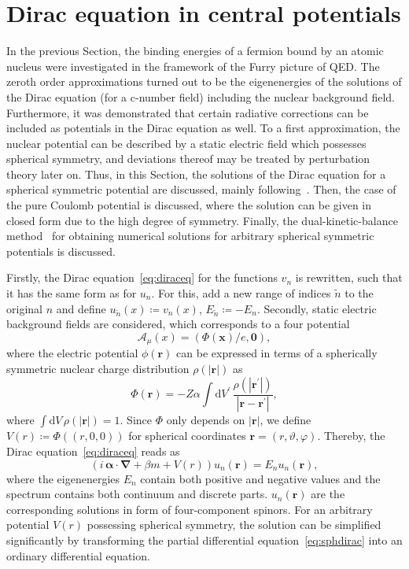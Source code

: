 \section{Dirac equation in central potentials}
\label{sec:sph_dirac}
In the previous Section, the binding energies of a fermion bound by an atomic nucleus were investigated in the framework of the Furry picture of QED. The zeroth order approximations turned out to be the eigenenergies of the solutions of the Dirac equation (for a c-number field) including the nuclear background field. Furthermore, it was demonstrated that certain radiative corrections can be included as potentials in the Dirac equation as well. To a first approximation, the nuclear potential can be described by a static electric field which possesses spherical symmetry, and deviations thereof may be treated by perturbation theory later on. Thus, in this Section, the solutions of the Dirac equation for a spherical symmetric potential are discussed, mainly following~\cite{greiner2000, weinberg2005}. Then, the case of the pure Coulomb potential is discussed, where the solution can be given in closed form due to the high degree of symmetry. Finally, the dual-kinetic-balance method~\cite{shabaev2004} for obtaining numerical solutions for arbitrary spherical symmetric potentials is discussed.

Firstly, the Dirac equation~\eqref{eq:diraceq} for the functions $v_n$ is rewritten, such that it has the same form as for $u_n$. For this, add a new range of indices $\tilde{n}$ to the original $n$ and define $u_{\tilde{n}}(x)\coloneqq v_n(x)$, $E_{\tilde{n}}\coloneqq -E_n$. Secondly, static electric background fields are considered, which corresponds to a four potential
\begin{equation}
\mathcal{A}_\mu(x)=(\Phi(\mathbf{x})/e,\mathbf{0}),
\end{equation}
where the electric potential $\phi(\mathbf{r})$ can be expressed in terms of a spherically symmetric nuclear charge distribution $\rho(\mathbf{|r|})$ as
\begin{equation}
\Phi(\mathbf{r})=-Z\alpha\int\mathrm{d}V^{\prime}\,\frac{\rho(|\mathbf{r^{\prime}}|)}{|\mathbf{r}-\mathbf{r^{\prime}}|},
\end{equation}
where $\int \mathrm{d}V\,\rho(|\mathbf{r}|)=1$. Since $\Phi$ only depends on $|\mathbf{r}|$, we define $V(r)\coloneqq \Phi((r,0,0))$ for spherical coordinates $\mathbf{r}=(r,\vartheta,\varphi)$. Thereby, the Dirac equation~\eqref{eq:diraceq} reads as
\begin{equation}
\left( i\,\pmb{\alpha} \cdot \mathbf{\nabla} + \beta m + V(r) \right) u_n(\mathbf{r}) =  E_n u_n(\mathbf{r}),
\label{eq:sphdirac}
\end{equation}
where the eigenenergies $E_n$ contain both positive and negative values and the spectrum contains both continuum and discrete parts. $u_n(\mathbf{r})$ are the corresponding solutions in form of four-component spinors. For an arbitrary potential $V(r)$ possessing spherical symmetry, the solution can be simplified significantly by transforming the partial differential equation~\eqref{eq:sphdirac} into an ordinary differential equation.

